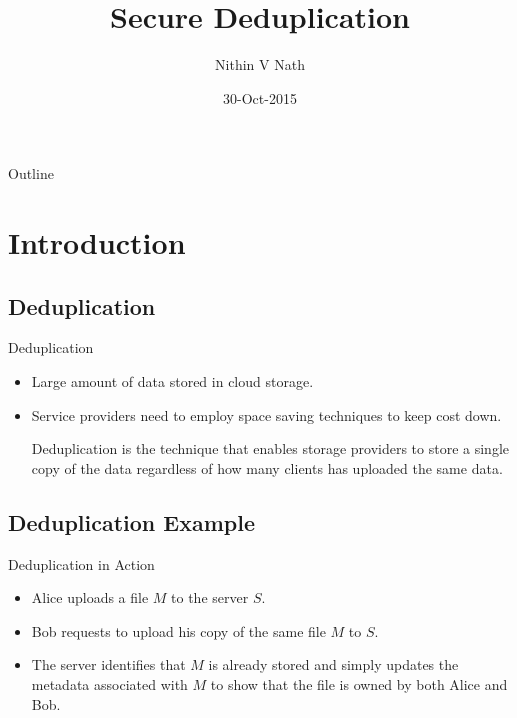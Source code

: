 \documentclass{beamer}
\title{Secure Deduplication}
\author{Nithin V Nath }
\institute[] %
{
	Advisor: Dr. Bhavana Kanukurthi\\\vspace*{2mm}
	Department of Computer Science and Automation\\
	Indian Institute of Science
}
\date{30-Oct-2015}
\begin{document}
\begin{frame}
  \titlepage
\end{frame}

\begin{frame}{Outline}
  \tableofcontents
\end{frame}

\section{Introduction}

\subsection{Deduplication}

\begin{frame}{Deduplication}{}
  \begin{itemize}
  \item {
    Large amount of data stored in cloud storage.
  }
  \item {
    Service providers need to employ space saving techniques to keep cost down.
  }
	\begin{definition}
		Deduplication is the technique that enables storage providers to store a single copy of the data
		regardless of how many clients has uploaded the same data.
	\end{definition}
  \end{itemize}
\end{frame}

\subsection{Deduplication Example}

\begin{frame}{Deduplication in Action}
  \begin{itemize}
  \item {
    Alice uploads a file $M$ to the server $S$.
    \pause %
  }
  \item {   
	 Bob requests to upload his copy of the same file $M$ to $S$.
  }
  \item<3-> {The server identifies
	that $M$ is already stored and simply updates the metadata associated with $M$ to show
	that the file is owned by both Alice and Bob.
  }
  \end{itemize}
\end{frame}
\end{document}

